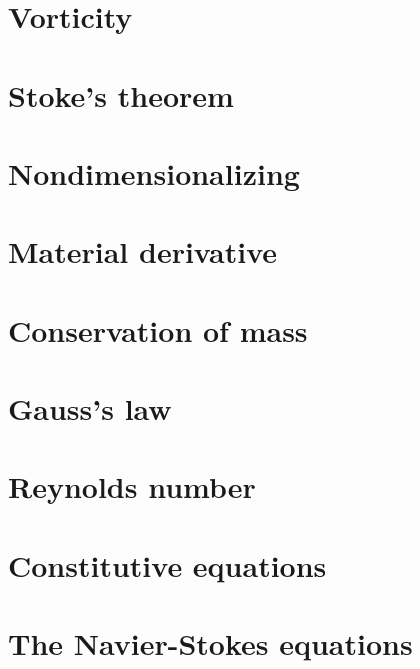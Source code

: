 \documentclass[10pt]{report}
\begin{document}


\chapter{Vorticity}



\chapter{Stoke's theorem}



\chapter{Nondimensionalizing}



\chapter{Material derivative}



\chapter{Conservation of mass}



\chapter{Gauss's law}

\chapter{Reynolds number}



\chapter{Constitutive equations}



\chapter{The Navier-Stokes equations}
\end{document}
